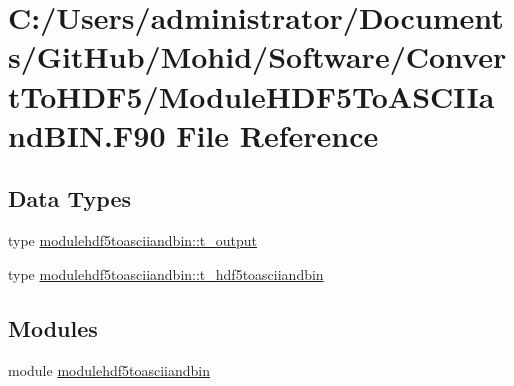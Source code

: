 \hypertarget{_module_h_d_f5_to_a_s_c_i_iand_b_i_n_8_f90}{}\section{C\+:/\+Users/administrator/\+Documents/\+Git\+Hub/\+Mohid/\+Software/\+Convert\+To\+H\+D\+F5/\+Module\+H\+D\+F5\+To\+A\+S\+C\+I\+Iand\+B\+IN.F90 File Reference}
\label{_module_h_d_f5_to_a_s_c_i_iand_b_i_n_8_f90}
\subsection*{Data Types}
\begin{DoxyCompactItemize}
\item 
type \mbox{\hyperlink{structmodulehdf5toasciiandbin_1_1t__output}{modulehdf5toasciiandbin\+::t\+\_\+output}}
\item 
type \mbox{\hyperlink{structmodulehdf5toasciiandbin_1_1t__hdf5toasciiandbin}{modulehdf5toasciiandbin\+::t\+\_\+hdf5toasciiandbin}}
\end{DoxyCompactItemize}
\subsection*{Modules}
\begin{DoxyCompactItemize}
\item 
module \mbox{\hyperlink{namespacemodulehdf5toasciiandbin}{modulehdf5toasciiandbin}}
\end{DoxyCompactItemize}
